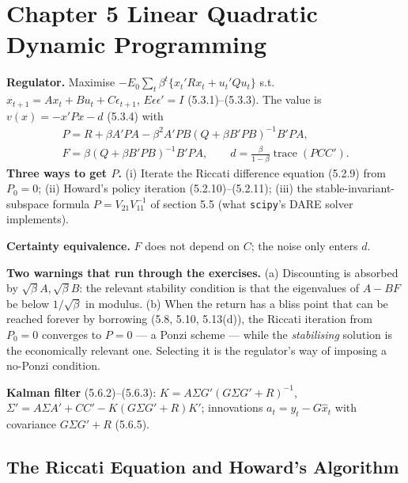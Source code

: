 \documentclass[12pt, letterpaper]{article}
\newcommand{\tr}{\operatorname{trace}}
\begin{document}
\tableofcontents
\newpage

\section{Chapter 5 \quad Linear Quadratic Dynamic Programming}

\begin{tcolorbox}[theorybox,title={Chapter 5 Overview}]
\textbf{Regulator.} Maximise $-E_0\sum_t\beta^t\{x_t'Rx_t+u_t'Qu_t\}$ s.t.\
$x_{t+1}=Ax_t+Bu_t+C\epsilon_{t+1}$, $E\epsilon\epsilon'=I$ (5.3.1)--(5.3.3). The value is
$v(x)=-x'Px-d$ (5.3.4) with
\begin{gather*}
P=R+\beta A'PA-\beta^2A'PB(Q+\beta B'PB)^{-1}B'PA,\\
F=\beta(Q+\beta B'PB)^{-1}B'PA,\qquad d=\frac{\beta}{1-\beta}\tr(PCC').
\end{gather*}
\textbf{Three ways to get $P$.} (i) Iterate the Riccati difference equation (5.2.9) from $P_0=0$;
(ii) Howard's policy iteration (5.2.10)--(5.2.11); (iii) the stable-invariant-subspace formula
$P=V_{21}V_{11}^{-1}$ of section 5.5 (what \texttt{scipy}'s DARE solver implements).

\textbf{Certainty equivalence.} $F$ does not depend on $C$; the noise only enters $d$.

\textbf{Two warnings that run through the exercises.} (a) Discounting is absorbed by
$\sqrt\beta A,\sqrt\beta B$: the relevant stability condition is that the eigenvalues of $A-BF$ be
below $1/\sqrt\beta$ in modulus. (b) When the return has a bliss point that can be reached forever by
borrowing (5.8, 5.10, 5.13(d)), the Riccati iteration from $P_0=0$ converges to $P=0$ --- a Ponzi
scheme --- while the \emph{stabilising} solution is the economically relevant one. Selecting it is
the regulator's way of imposing a no-Ponzi condition.

\textbf{Kalman filter} (5.6.2)--(5.6.3): $K=A\Sigma G'(G\Sigma G'+R)^{-1}$,
$\Sigma'=A\Sigma A'+CC'-K(G\Sigma G'+R)K'$; innovations $a_t=y_t-G\hat x_t$ with covariance
$G\Sigma G'+R$ (5.6.5).
\end{tcolorbox}

\subsection{The Riccati Equation and Howard's Algorithm}
\end{document}
